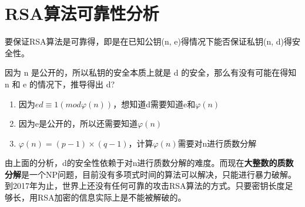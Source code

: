 \chapter{RSA算法可靠性分析}

要保证RSA算法是可靠得，即是在已知公钥(n, e)得情况下能否保证私钥(n, d)得安全性。

因为 n 是公开的，所以私钥的安全本质上就是 d 的安全，那么有没有可能在得知 n 和 e 的情况下，推导得出 d?

\begin{enumerate}
    \item 因为$ ed \equiv 1 (mod \varphi(n))$，想知道d需要知道e和$\varphi(n)$
    \item 因为e是公开的，所以还需要知道$\varphi(n)$
    \item $\varphi(n)=(p-1) \times (q-1)$，计算$\varphi(n)$需要对n进行质数分解
\end{enumerate}

由上面的分析，d的安全性依赖于对n进行质数分解的难度。而现在\textbf{大整数的质数分解}是一个NP问题，目前没有多项式时间的算法可以解决，只能进行暴力破解。到2017年为止，世界上还没有任何可靠的攻击RSA算法的方式。只要密钥长度足够长，用RSA加密的信息实际上是不能被解破的。